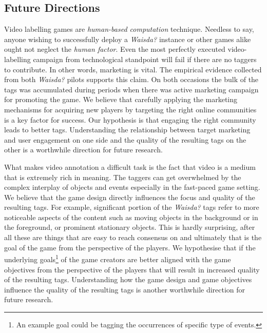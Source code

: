 
\subsection{Future Directions}
Video labelling games are \textit{human-based computation} technique. Needless to say, anyone wishing to successfully deploy a \textit{Waisda?} instance or other games alike ought not neglect the \textit{human factor}. Even the most perfectly executed video-labelling campaign from technological standpoint will fail if there are no taggers to contribute. In other words, marketing is vital. The empirical evidence collected from both \textit{Waisda?} pilots supports this claim. On both occasions the bulk of the tags was accumulated during periods when there was active marketing campaign for promoting the game. We believe that carefully applying the marketing mechanisms for acquiring new players by targeting the right online communities is a key factor for success. Our hypothesis is that engaging the right community leads to better tags. Understanding the relationship between target marketing and user engagement on one side and the quality of the resulting tags on the other is a worthwhile direction for future research.

What makes video annotation a difficult task is the fact that video is a medium that is extremely rich in meaning. The taggers can get overwhelmed by the complex interplay of objects and events especially in the fast-paced game setting. We believe that the game design directly influences the focus and quality of the resulting tags. For example, significant portion of the \textit{Waisda?} tags refer to more noticeable aspects of the content such as moving objects in the background or in the foreground, or prominent stationary objects. This is hardly surprising, after all these are things that are easy to reach consensus on and ultimately that is the goal of the game from the perspective of the players. We hypothesise that if the underlying goals\footnote{An example goal could be tagging the occurrences of specific type of events.} of the game creators are better aligned with the game objectives from the perspective of the players that will result in increased quality of the resulting tags. Understanding how the game design and game objectives influence the quality of the resulting tags is another worthwhile direction for future research. 

